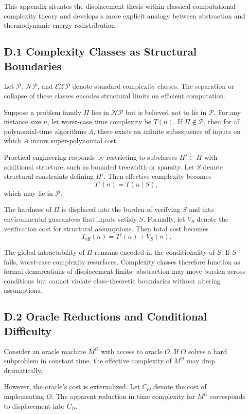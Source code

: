 \documentclass[11pt]{article}
\begin{document}
This appendix situates the displacement thesis within classical computational complexity theory and develops a more explicit analogy between abstraction and thermodynamic energy redistribution.

\subsection{D.1 Complexity Classes as Structural Boundaries}

Let $\mathcal{P}$, $\mathcal{NP}$, and $\mathcal{EXP}$ denote standard complexity classes. The separation or collapse of these classes encodes structural limits on efficient computation.

Suppose a problem family $\Pi$ lies in $\mathcal{NP}$ but is believed not to lie in $\mathcal{P}$. For any instance size $n$, let worst-case time complexity be $T(n)$. If $\Pi \notin \mathcal{P}$, then for all polynomial-time algorithms $A$, there exists an infinite subsequence of inputs on which $A$ incurs super-polynomial cost.

Practical engineering responds by restricting to subclasses $\Pi' \subset \Pi$ with additional structure, such as bounded treewidth or sparsity. Let $S$ denote structural constraints defining $\Pi'$. Then effective complexity becomes
\[
T'(n) = T(n \mid S),
\]
which may lie in $\mathcal{P}$.

The hardness of $\Pi$ is displaced into the burden of verifying $S$ and into environmental guarantees that inputs satisfy $S$. Formally, let $V_S$ denote the verification cost for structural assumptions. Then total cost becomes
\[
T_{\text{eff}}(n) = T'(n) + V_S(n).
\]

The global intractability of $\Pi$ remains encoded in the conditionality of $S$. If $S$ fails, worst-case complexity resurfaces. Complexity classes therefore function as formal demarcations of displacement limits: abstraction may move burden across conditions but cannot violate class-theoretic boundaries without altering assumptions.

\subsection{D.2 Oracle Reductions and Conditional Difficulty}

Consider an oracle machine $M^O$ with access to oracle $O$. If $O$ solves a hard subproblem in constant time, the effective complexity of $M^O$ may drop dramatically.

However, the oracle's cost is externalized. Let $C_O$ denote the cost of implementing $O$. The apparent reduction in time complexity for $M^O$ corresponds to displacement into $C_O$.
\end{document}

